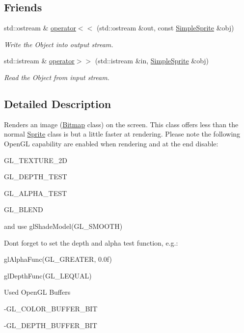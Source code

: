 \subsection*{Friends}
\begin{DoxyCompactItemize}
\item 
std::ostream \& \hyperlink{class_f2_c_1_1_simple_sprite_a3e927c7116fdfb05406668198f421173}{operator$<$$<$} (std::ostream \&out, const \hyperlink{class_f2_c_1_1_simple_sprite}{SimpleSprite} \&obj)
\begin{DoxyCompactList}\small\item\em Write the Object into output stream. \item\end{DoxyCompactList}\item 
std::istream \& \hyperlink{class_f2_c_1_1_simple_sprite_aa09c4cd4e20e8202e32c26449b967252}{operator$>$$>$} (std::istream \&in, \hyperlink{class_f2_c_1_1_simple_sprite}{SimpleSprite} \&obj)
\begin{DoxyCompactList}\small\item\em Read the Object from input stream. \item\end{DoxyCompactList}\end{DoxyCompactItemize}


\subsection{Detailed Description}
Renders an image (\hyperlink{class_f2_c_1_1_bitmap}{Bitmap} class) on the screen. This class offers less than the normal \hyperlink{class_f2_c_1_1_sprite}{Sprite} class is but a little faster at rendering. Please note the following OpenGL capability are enabled when rendering and at the end disable: \par
 GL\_\-TEXTURE\_\-2D \par
 GL\_\-DEPTH\_\-TEST \par
 GL\_\-ALPHA\_\-TEST \par
 GL\_\-BLEND \par
 and use glShadeModel(GL\_\-SMOOTH) \par
 \par
 Dont forget to set the depth and alpha test function, e.g.: \par
 glAlphaFunc(GL\_\-GREATER, 0.0f) \par
 glDepthFunc(GL\_\-LEQUAL) \par
 \par
 Used OpenGL Buffers \par
 -\/GL\_\-COLOR\_\-BUFFER\_\-BIT \par
 -\/GL\_\-DEPTH\_\-BUFFER\_\-BIT \par
 

